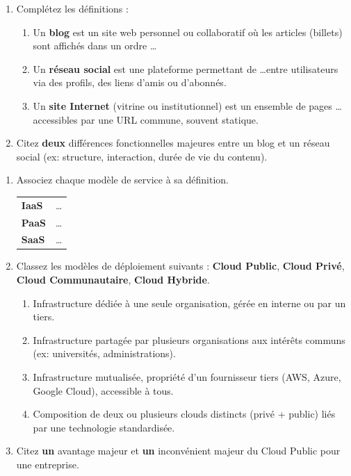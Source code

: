 \documentclass[11pt]{article}
\begin{document}
\begin{exercice}
\begin{enumerate}
    \item Complétez les définitions :
    \begin{enumerate}
        \item Un \textbf{blog} est un site web personnel ou collaboratif où les articles (billets) sont affichés dans un ordre \ldots
        \item Un \textbf{réseau social} est une plateforme permettant de \ldots entre utilisateurs via des profils, des liens d'amis ou d'abonnés.
        \item Un \textbf{site Internet} (vitrine ou institutionnel) est un ensemble de pages \ldots accessibles par une URL commune, souvent statique.
    \end{enumerate}
    \item Citez \textbf{deux} différences fonctionnelles majeures entre un blog et un réseau social (ex: structure, interaction, durée de vie du contenu).
\end{enumerate}
\end{exercice}

\begin{exercice}
\begin{enumerate}
    \item Associez chaque modèle de service à sa définition.
    \begin{tabular}{|p{3cm}|p{11cm}|}
        \hline
        \textbf{IaaS} & \ldots \\
        \textbf{PaaS} & \ldots \\
        \textbf{SaaS} & \ldots \\
        \hline
    \end{tabular}
    \item Classez les modèles de déploiement suivants : \textbf{Cloud Public}, \textbf{Cloud Privé}, \textbf{Cloud Communautaire}, \textbf{Cloud Hybride}.
    \begin{enumerate}
        \item Infrastructure dédiée à une seule organisation, gérée en interne ou par un tiers.
        \item Infrastructure partagée par plusieurs organisations aux intérêts communs (ex: universités, administrations).
        \item Infrastructure mutualisée, propriété d'un fournisseur tiers (AWS, Azure, Google Cloud), accessible à tous.
        \item Composition de deux ou plusieurs clouds distincts (privé + public) liés par une technologie standardisée.
    \end{enumerate}
    \item Citez \textbf{un} avantage majeur et \textbf{un} inconvénient majeur du Cloud Public pour une entreprise.
\end{enumerate}
\end{exercice}
\end{document}
